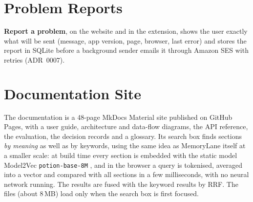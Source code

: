 \section{Problem Reports}

\textbf{Report a problem}, on the website and in the extension, shows the
user exactly what will be sent (message, app version, page, browser, last
error) and stores the report in SQLite before a background sender emails it
through Amazon SES with retries (ADR~0007).

\section{Documentation Site}

The documentation is a 48-page MkDocs Material \cite{mkdocsmaterial} site
published on GitHub Pages, with a user guide, architecture and data-flow
diagrams, the API reference, the evaluation, the decision records and a
glossary. Its search box finds sections \emph{by meaning} as well as by
keywords, using the same idea as MemoryLane itself at a smaller scale: at
build time every section is embedded with the static model Model2Vec
\texttt{potion-base-8M} \cite{model2vec}, and in the browser a query is
tokenised, averaged into a vector and compared with all sections in a few
milliseconds, with no neural network running. The results are fused with the
keyword results by RRF. The files (about 8\,MB) load only when the search box
is first focused.
